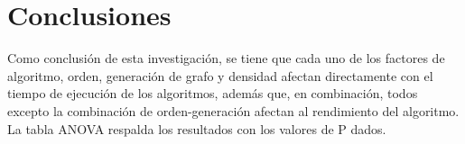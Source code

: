 \documentclass{article}
\begin{document}
\section{Conclusiones}
Como conclusión de esta investigación, se tiene que cada uno de los factores de algoritmo, orden, generación de grafo y densidad afectan directamente con el tiempo de ejecución de los algoritmos, además que, en combinación, todos excepto la combinación de orden-generación afectan al rendimiento del algoritmo. La tabla ANOVA respalda los resultados con los valores de P dados.


\end{document}
